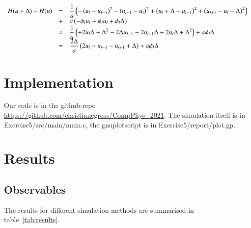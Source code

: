 \documentclass{scrartcl}
\begin{document}
\[\begin{array}{>{\displaystyle}r>{\displaystyle}c>{\displaystyle}l}
H(u+\Delta)-H(u)&=&\frac{1}{a}\left( -\left(u_l-u_{l-1} \right)^2-\left(u_{l+1}-u_{l}  \right)^2+\left(u_l+\Delta-u_{l-1}  \right)^2+\left( u_{l+1}-u_{l}-\Delta \right)^2\right) \\&+&a\left( -\phi_lu_l+\phi_lu_l+\phi_l\Delta\right) \\



&=&\frac{1}{a}\left(+2u_l\Delta+\Delta^2-2\Delta u_{l-1}-2u_{l+1}\Delta+2u_l\Delta+\Delta^2 \right) +a\phi_l\Delta \\

&=&\frac{2\Delta}{a}\left(2u_l-u_{l-1}-u_{l+1}+\Delta \right)+ a\phi_l\Delta

\end{array}\]

\section{Implementation}

Our code is in the github-repo \url{https://github.com/christianegross/CompPhys\_2021}. The simulation itself is in Exercise5/src/main/main.c, the gnuplotscript is in Exercise5/report/plot.gp. 

\section{Results}
 

\subsection{Observables}

The results for different simulation methods are summarised in table~\ref{tab:results}.
\end{document}
